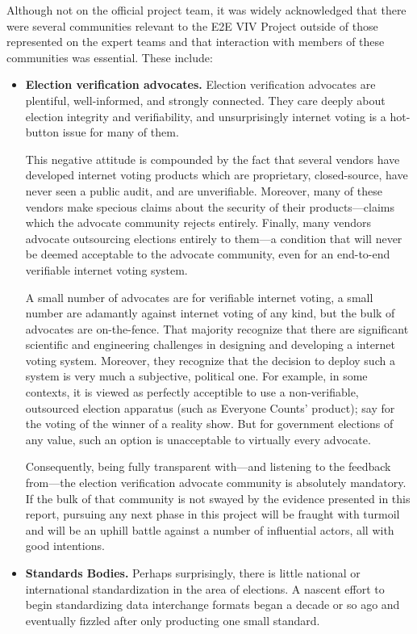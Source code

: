 Although not on the official project team, it was widely acknowledged
that there were several communities relevant to the E2E VIV Project
outside of those represented on the expert teams and that interaction
with members of these communities was essential. These include: 
\begin{itemize}
\item \textbf{Election verification advocates.} Election verification
  advocates are plentiful, well-informed, and strongly connected.
  They care deeply about election integrity and verifiability, and
  unsurprisingly internet voting is a hot-button issue for many of
  them.

  This negative attitude is compounded by the fact that several
  vendors have developed internet voting products which are
  proprietary, closed-source, have never seen a public audit, and are
  unverifiable.  Moreover, many of these vendors make specious claims
  about the security of their products---claims which the advocate
  community rejects entirely.  Finally, many vendors advocate
  outsourcing elections entirely to them---a condition that will never
  be deemed acceptable to the advocate community, even for an
  end-to-end verifiable internet voting system.

  A small number of advocates are for verifiable internet voting, a
  small number are adamantly against internet voting of any kind, but
  the bulk of advocates are on-the-fence.  That majority recognize
  that there are significant scientific and engineering challenges in
  designing and developing a internet voting system.  Moreover, they
  recognize that the decision to deploy such a system is very much a
  subjective, political one.  For example, in some contexts, it is
  viewed as perfectly acceptible to use a non-verifiable, outsourced
  election apparatus (such as Everyone Counts' product); say for the
  voting of the winner of a reality show.  But for government
  elections of any value, such an option is unacceptable to virtually
  every advocate.

  Consequently, being fully transparent with---and listening to the
  feedback from---the election verification advocate community is
  absolutely mandatory.  If the bulk of that community is not swayed
  by the evidence presented in this report, pursuing any next phase in
  this project will be fraught with turmoil and will be an uphill
  battle against a number of influential actors, all with good
  intentions.
\item \textbf{Standards Bodies.} Perhaps surprisingly, there is little
  national or international standardization in the area of elections.
  A nascent effort to begin standardizing data interchange formats
  began a decade or so ago and eventually fizzled after only
  producting one small standard.  


\end{itemize}
